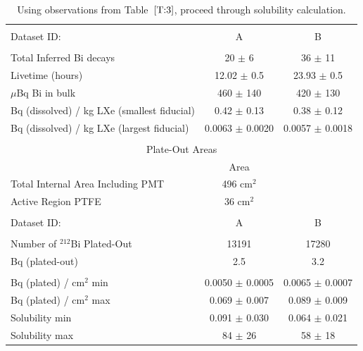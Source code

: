 \begin{table}[ht]
\centering
\caption{Using observations from Table~$\ref{T:3}$, proceed through solubility calculation.}
\begin{tabular}{lcc}
\hline
\\[-5pt]
Dataset ID: & A &B \\
\\[-5pt]
\hline

Total Inferred Bi decays & 20 $\pm$ 6 & 36 $\pm$ 11 \\
Livetime (hours) & 12.02 $\pm$ 0.5 & 23.93 $\pm$ 0.5 \\
$\mu$Bq Bi in bulk & 460 $\pm$ 140 &  420 $\pm$ 130 \\
Bq (dissolved) / kg LXe (smallest fiducial) & 0.42 $\pm$ 0.13 & 0.38 $\pm$ 0.12 \\
Bq (dissolved) / kg LXe (largest fiducial) & 0.0063 $\pm$ 0.0020  &  0.0057 $\pm$ 0.0018\\
\hline \\
\multicolumn{3}{c}{Plate-Out Areas} \\
\hline
 & Area \\
Total Internal Area Including PMT & 496 cm$^{2}$ \\ %
Active Region PTFE & 36 cm$^{2}$ \\ %
\hline \\
Dataset ID: & A &B \\
\hline \\
Number of $^{212}$Bi Plated-Out & 13191  & 17280 \\
Bq (plated-out) & 2.5  & 3.2 \\
\hline \\
Bq (plated) / cm$^{2}$ min & 0.0050  $\pm$ 0.0005  & 0.0065  $\pm$ 0.0007\\
Bq (plated) / cm$^{2}$ max & 0.069  $\pm$ 0.007 & 0.089  $\pm$ 0.009  \\
\hline
Solubility min & 0.091 $\pm$ 0.030 & 0.064 $\pm$ 0.021\\
Solubility max & 84 $\pm$ 26 & 58 $\pm$ 18 \\


\end{tabular}
\end{table}
